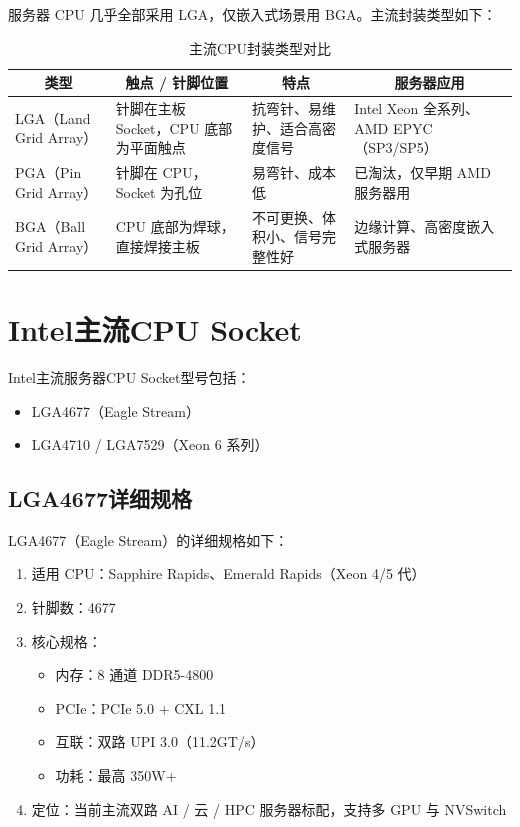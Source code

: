 \documentclass[12pt,UTF8]{ctexbook}
\begin{document}
服务器 CPU 几乎全部采用 LGA，仅嵌入式场景用 BGA。主流封装类型如下：

\begin{table}[H]
  \centering
  \begin{tabularx}{\textwidth}{|p{4.5cm}|X|X|X|}
    \hline
    \multicolumn{1}{|c|}{\textbf{类型}} & \multicolumn{1}{c|}{\textbf{触点 / 针脚位置}} & \multicolumn{1}{c|}{\textbf{特点}} & \multicolumn{1}{c|}{\textbf{服务器应用}} \\
    \hline
    LGA（Land Grid Array） & 针脚在主板 Socket，CPU 底部为平面触点 & 抗弯针、易维护、适合高密度信号 & Intel Xeon 全系列、AMD EPYC（SP3/SP5） \\
    \hline
    PGA（Pin Grid Array） & 针脚在 CPU，Socket 为孔位 & 易弯针、成本低 & 已淘汰，仅早期 AMD 服务器用 \\
    \hline
    BGA（Ball Grid Array） & CPU 底部为焊球，直接焊接主板 & 不可更换、体积小、信号完整性好 & 边缘计算、高密度嵌入式服务器 \\
    \hline
  \end{tabularx}
  \caption{主流CPU封装类型对比}
  \label{tab:cpu_package_types}
\end{table}

\section{Intel主流CPU Socket}

Intel主流服务器CPU Socket型号包括：

\begin{itemize}[leftmargin=2em]
  \item LGA4677（Eagle Stream）
  \item LGA4710 / LGA7529（Xeon 6 系列）
\end{itemize}

\subsection{LGA4677详细规格}

LGA4677（Eagle Stream）的详细规格如下：

\begin{enumerate}
  \item 适用 CPU：Sapphire Rapids、Emerald Rapids（Xeon 4/5 代）
  \item 针脚数：4677
  \item 核心规格：
    \begin{itemize}[leftmargin=2em]
      \item 内存：8 通道 DDR5-4800
      \item PCIe：PCIe 5.0 + CXL 1.1
      \item 互联：双路 UPI 3.0（11.2GT/s）
      \item 功耗：最高 350W+
    \end{itemize}
  \item 定位：当前主流双路 AI / 云 / HPC 服务器标配，支持多 GPU 与 NVSwitch
\end{enumerate}
\end{document}
